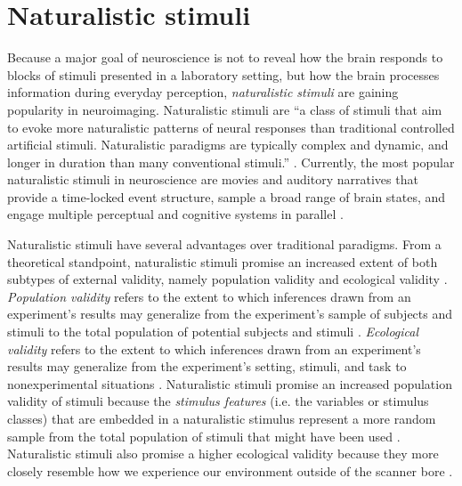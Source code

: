 \section{Naturalistic stimuli}
Because a major goal of neuroscience is not to reveal how the brain responds to
blocks of stimuli presented in a laboratory setting, but how the brain processes
information during everyday perception, \textit{naturalistic stimuli} are
gaining popularity in neuroimaging.
Naturalistic stimuli are ``a class of stimuli that aim to evoke more
naturalistic patterns of neural responses than traditional controlled artificial
stimuli. Naturalistic paradigms are typically complex and dynamic, and longer in
duration than many conventional stimuli.'' \citep[][p. 2]{vanderwal2019movies}.
Currently, the most popular naturalistic stimuli in neuroscience are movies and
auditory narratives \citep[cf.][for an introduction]{sonkusare2019naturalistic}
that provide a time-locked event structure, sample a broad range of brain
states, and engage multiple perceptual and cognitive systems in parallel
\citep{haxby2020naturalistic}.

%
Naturalistic stimuli have several advantages over traditional paradigms.
From a theoretical standpoint, naturalistic stimuli promise an increased extent
of both subtypes of external validity, namely population validity and ecological
validity \citep{bracht1968external}.
%
\textit{Population validity} refers to the extent to which inferences drawn from
an experiment's results may generalize from the experiment's sample of subjects
and stimuli to the total population of potential subjects and stimuli
\citep{bracht1968external, westfall2016fixing}.
%
\textit{Ecological validity} refers to the extent to which inferences drawn from
an experiment's results may generalize from the experiment's setting, stimuli,
and task to nonexperimental situations \citep{bracht1968external,
orne1962social, schmuckler2001ecological}.
Naturalistic stimuli promise an increased population validity of stimuli because
the \textit{stimulus features} (i.e. the variables or stimulus classes) that are
embedded in a naturalistic stimulus represent a more random sample from the
total population of stimuli that might have been used
\citep{westfall2016fixing}.
Naturalistic stimuli also promise a higher ecological validity because they more
closely resemble how we experience our environment outside of the scanner bore
\citep{hasson2012future}.

